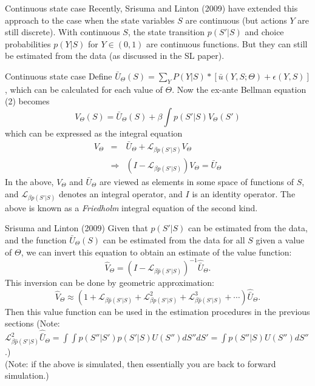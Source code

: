 \documentclass[xcolor=pdftex,dvipsnames,table,mathserif]{beamer}
\begin{document}
\begin{frame}{Continuous state case}
Recently, Srisuma and Linton (2009) have extended this approach to the case when the state variables $S$ are continuous (but actions $Y$ are still discrete). With continuous $S$, the state transition $p(S'|S)$ and choice probabilities $p(Y|S)$ for $Y \in (0,1)$ are continuous functions. But they can still be estimated from the data (as discussed in the SL paper). \\
\end{frame}

\begin{frame}{Continuous state case}
Define $\bar U_\Theta (S) = \sum_Y P(Y|S) * [ \bar u (Y,S;\Theta) + \epsilon(Y,S)]$, which can be calculated for each value of $\Theta$. Now the ex-ante Bellman equation (2) becomes
\begin{equation*}
V_\Theta (S) = \bar U_\Theta (S) + \beta \int p(S'|S) V_\Theta(S')
\end{equation*}
which can be expressed as the integral equation
\begin{eqnarray*}
V_\Theta &=& \bar U_\Theta + \mathcal{L}_{\beta p (S'|S)} V_\Theta \\
&\Rightarrow& (I - \mathcal{L}_{\beta p (S'|S)})V_\Theta = \bar U_\Theta
\end{eqnarray*}
In the above, $V_\Theta$ and $\bar U_\Theta$ are viewed as elements in some space of functions of $S$, and $\mathcal{L}_{\beta p (S'|S)}$ denotes an integral operator, and $I$ is an identity operator. The above is known as a \emph{Friedholm} integral equation of the second kind.
\end{frame}


\begin{frame}{Srisuma and Linton (2009)}
Given that $p(S'|S)$ can be estimated from the data, and the function $\bar U_\Theta (S)$ can be estimated from the data for all $S$ given a value of $\Theta$, we can invert this equation to obtain an estimate of the value function:
\begin{equation*}
\hat V_\Theta = (I - \mathcal{L}_{\beta \hat p (S'|S)})^{-1} \hat{\bar U}_{\Theta}.
\end{equation*}
This inversion can be done by geometric approximation:
\begin{equation*}
\hat V_\Theta \approx (1 +  \mathcal{L}_{\beta \hat p (S'|S)} + \mathcal{L}^2_{\beta \hat p (S'|S)} + \mathcal{L}^3_{\beta \hat p (S'|S)} + \cdots ) \hat{\bar U}_{\Theta}.
\end{equation*}
Then this value function can be used in the estimation procedures in the previous sections
 (Note: $\mathcal{L}^2_{\beta \hat p (S'|S)}\hat{\bar U}_{\Theta} = \int \int p(S''|S') p(S'|S) U(S'')dS''dS' = \int p(S''|S) U(S'') dS''$.)\\ 
 \vspace{0.5cm}
(Note: if the above is simulated, then essentially you are back to forward simulation.)
\end{frame}
\end{document}
